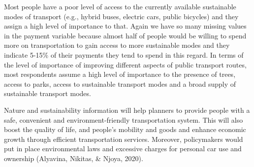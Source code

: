 \documentclass[
11pt, %
oneside, %
english, %
singlespacing, %
]{macthesis} %
\begin{document}
Most people have a poor level of access to the currently available sustainable modes of transport (e.g., hybrid buses, electric cars, public bicycles) and they assign a high level of importance to that. Again we have so many missing values in the payment variable because almost half of people would be willing to spend more on transportation to gain access to more sustainable modes and they indicate 5-15\% of their payments they tend to spend in this regard. In terms of the level of importance of improving different aspects of public transport routes, most respondents assume a high level of importance to the presence of trees, access to parks, access to sustainable transport modes and a broad supply of sustainable transport modes.

Nature and sustainability information will help planners to provide people with a safe, convenient and environment-friendly transportation system. This will also boost the quality of life, and people's mobility and goods and enhance economic growth through efficient transportation services. Moreover, policymakers would put in place environmental laws and excessive charges for personal car use and ownership (Alyavina, Nikitas, \& Njoya, 2020).
\end{document}
